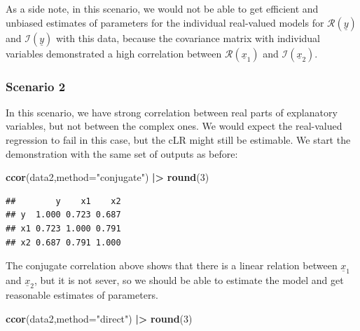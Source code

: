 \documentclass[
]{book}
\newenvironment{Shaded}{\begin{snugshade}}{\end{snugshade}}
\newcommand{\DataTypeTok}[1]{\textcolor[rgb]{0.13,0.29,0.53}{#1}}
\newcommand{\DecValTok}[1]{\textcolor[rgb]{0.00,0.00,0.81}{#1}}
\newcommand{\ErrorTok}[1]{\textcolor[rgb]{0.64,0.00,0.00}{\textbf{#1}}}
\newcommand{\KeywordTok}[1]{\textcolor[rgb]{0.13,0.29,0.53}{\textbf{#1}}}
\newcommand{\NormalTok}[1]{#1}
\newcommand{\OperatorTok}[1]{\textcolor[rgb]{0.81,0.36,0.00}{\textbf{#1}}}
\newcommand{\StringTok}[1]{\textcolor[rgb]{0.31,0.60,0.02}{#1}}
\begin{document}
As a side note, in this scenario, we would not be able to get efficient and unbiased estimates of parameters for the individual real-valued models for \(\mathcal{R}\left(\underline{y}\right)\) and \(\mathcal{I}\left(\underline{y}\right)\) with this data, because the covariance matrix with individual variables demonstrated a high correlation between \(\mathcal{R}\left(\underline{x}_1\right)\) and \(\mathcal{I}\left(\underline{x}_2\right)\).

\hypertarget{scenario-2}{%
\subsubsection*{Scenario 2}\label{scenario-2}}

In this scenario, we have strong correlation between real parts of explanatory variables, but not between the complex ones. We would expect the real-valued regression to fail in this case, but the cLR might still be estimable. We start the demonstration with the same set of outputs as before:

\begin{Shaded}
\begin{Highlighting}[]
\KeywordTok{ccor}\NormalTok{(data2,}\DataTypeTok{method=}\StringTok{"conjugate"}\NormalTok{) }\OperatorTok{|}\ErrorTok{\textgreater{}}\StringTok{ }\KeywordTok{round}\NormalTok{(}\DecValTok{3}\NormalTok{)}
\end{Highlighting}
\end{Shaded}

\begin{verbatim}
##        y    x1    x2
## y  1.000 0.723 0.687
## x1 0.723 1.000 0.791
## x2 0.687 0.791 1.000
\end{verbatim}

The conjugate correlation above shows that there is a linear relation between \(\underline{x}_{1}\) and \(\underline{x}_{2}\), but it is not sever, so we should be able to estimate the model and get reasonable estimates of parameters.

\begin{Shaded}
\begin{Highlighting}[]
\KeywordTok{ccor}\NormalTok{(data2,}\DataTypeTok{method=}\StringTok{"direct"}\NormalTok{) }\OperatorTok{|}\ErrorTok{\textgreater{}}\StringTok{ }\KeywordTok{round}\NormalTok{(}\DecValTok{3}\NormalTok{)}
\end{Highlighting}
\end{Shaded}
\end{document}
